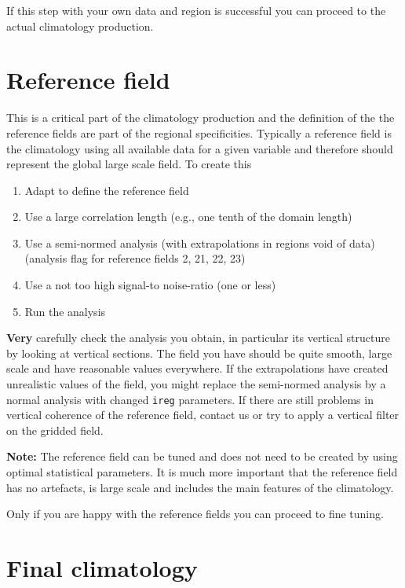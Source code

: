 \documentclass[a4paper,12pt,oneside,notitlepage]{book}
\newcommand{\file}[1]{\texttt{\color{MidnightBlue}{#1}}}
\begin{document}
If this step with your own data and region is successful you can proceed to the actual climatology production.  


\section{Reference field}

This is a critical part of the climatology production and the definition of the the reference fields are part of the regional specificities. Typically a reference field is the climatology using all available data for a given variable and therefore should represent the global large scale field. To create this

\begin{enumerate}
\item Adapt \file{yearlist, monthlist, varlist} to define the reference field
\item Use a large correlation length (e.g., one tenth of the domain length)
\item Use a semi-normed analysis (with extrapolations in regions void of data) (analysis flag for reference fields 2, 21, 22, 23)
\item Use a not too high signal-to noise-ratio (one or less)
\item Run the analysis
\end{enumerate}
{\bf Very} carefully check the analysis you obtain, in particular its vertical structure by looking at vertical sections. The field you have should be quite smooth, large scale and have reasonable values everywhere. If the extrapolations have created unrealistic values of the field, you might replace the semi-normed analysis by a normal analysis with changed {\tt ireg} parameters. If there are still problems in vertical coherence of the reference field, contact us or try to apply a vertical filter on the gridded field.

{\bf Note:} The reference field can be tuned and does not need to be created by using optimal statistical parameters. It is much more important that the reference field has no artefacts, is large scale and includes the main features of the climatology.


Only if you are happy with the reference fields you can proceed to fine tuning.

\section{Final climatology}
\end{document}
